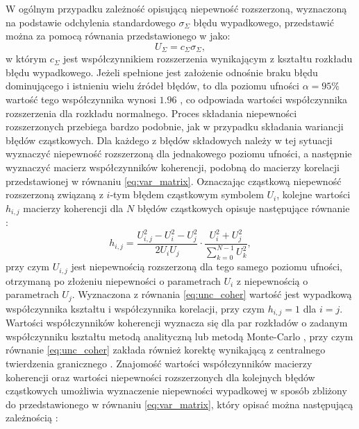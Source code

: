 W ogólnym przypadku zależność opisującą niepewność rozszerzoną, wyznaczoną na podstawie odchylenia standardowego $\sigma_{\Sigma}$ błędu wypadkowego, przedstawić można za pomocą równania przedstawionego w \cite{jcgm_guide} jako:
\begin{equation}
U_{\Sigma} = c_{\Sigma} \sigma_{\Sigma} \label{eq:unc_sum},
\end{equation}
w którym $c_{\Sigma}$ jest współczynnikiem rozszerzenia wynikającym z kształtu rozkładu błędu wypadkowego. Jeżeli spełnione jest założenie odnośnie braku błędu dominującego i istnieniu wielu źródeł błędów, to dla poziomu ufności $\alpha = 95\%$ wartość tego współczynnika wynosi $1.96$ \cite{jcgm_guide}, co odpowiada wartości współczynnika rozszerzenia dla rozkładu normalnego. Proces składania niepewności rozszerzonych przebiega bardzo podobnie, jak w przypadku składania wariancji błędów cząstkowych. Dla każdego z błędów składowych należy w tej sytuacji wyznaczyć niepewność rozszerzoną dla jednakowego poziomu ufności, a następnie wyznaczyć macierz współczynników koherencji, podobną do macierzy korelacji przedstawionej w równaniu \eqref{eq:var_matrix}. Oznaczając cząstkową niepewność rozszerzoną związaną z $i$-tym błędem cząstkowym symbolem $U_{i}$, kolejne wartości $h_{i,j}$ macierzy koherencji dla $N$ błędów cząstkowych opisuje następujące równanie \cite{jakubiec_reductive}:
\begin{equation}
h_{i,j} = \frac{U_{i,j}^{2} - U_{i}^{2} - U_{j}^{2}}{2 U_{i} U_{j}} \cdot \frac{U_{i}^{2} + U_{j}^{2}}{\sum _{k = 0} ^{N-1} U_{k}^{2}} \label{eq:unc_coher},
\end{equation}
przy czym $U_{i,j}$ jest niepewnością rozszerzoną dla tego samego poziomu ufności, otrzymaną po złożeniu niepewności o parametrach $U_{i}$ z niepewnością o parametrach $U_{j}$. Wyznaczona z równania \eqref{eq:unc_coher} wartość jest wypadkową współczynnika kształtu i współczynnika korelacji, przy czym $h_{i,j} = 1$ dla $i = j$. Wartości współczynników koherencji wyznacza się dla par rozkładów o zadanym współczynniku kształtu metodą analityczną lub metodą Monte-Carlo \cite{jakubiec_arithmetic}, przy czym równanie \eqref{eq:unc_coher} zakłada również korektę wynikającą z centralnego twierdzenia granicznego \cite{jakubiec_system}. Znajomość wartości współczynników macierzy koherencji oraz wartości niepewności rozszerzonych dla kolejnych błędów cząstkowych umożliwia wyznaczenie niepewności wypadkowej w sposób zbliżony do przedstawionego w równaniu \eqref{eq:var_matrix}, który opisać można następującą zależnością \cite{jakubiec_reductive}:
